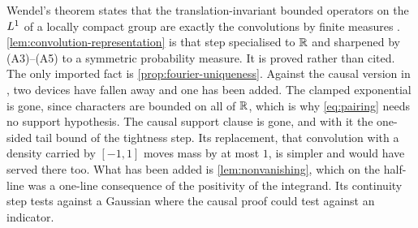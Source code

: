 \begin{remark}\label{rem:wendel}
Wendel's theorem states that the translation-invariant bounded
operators on the $L^1$ of a locally compact group are exactly the convolutions by finite
measures . \ref{lem:convolution-representation} is that step specialised
to $\mathbb{R}$ and sharpened by (A3)--(A5) to a
symmetric probability measure. It is proved rather than cited. The only imported fact is
\ref{prop:fourier-uniqueness}. Against the causal version in ,
two devices have fallen away and
one has been added. The clamped exponential is gone, since characters are bounded on all of
$\mathbb{R}$, which is why \ref{eq:pairing} needs no support hypothesis. The causal support clause is
gone, and with it the one-sided tail bound of the tightness step. Its replacement, that
convolution with a density carried by $[-1,1]$ moves mass by at most $1$, is simpler and
would have served there too. What has been added is \ref{lem:nonvanishing}, which on the
half-line was a one-line consequence of the positivity of the integrand. Its continuity step
tests against a Gaussian where the causal proof could test against an indicator.
\end{remark}
